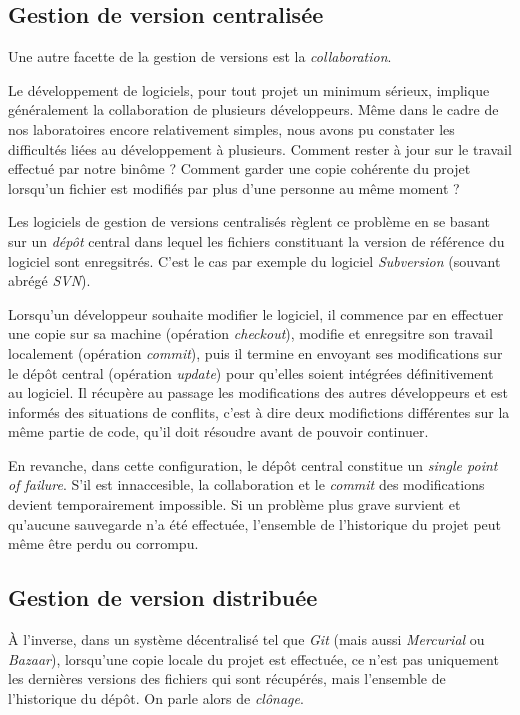 \documentclass[11pt,a4paper]{article}
\begin{document}
\subsection{Gestion de version centralisée}

Une autre facette de la gestion de versions est la \textit{collaboration}. 

Le développement de logiciels, pour tout projet un minimum sérieux, implique généralement la collaboration de plusieurs développeurs. Même dans le cadre de nos laboratoires encore relativement simples, nous avons pu constater les difficultés liées au développement à plusieurs. Comment rester à jour sur le travail effectué par notre binôme ? Comment garder une copie cohérente du projet lorsqu'un fichier est modifiés par plus d'une personne au même moment ?

Les logiciels de gestion de versions centralisés règlent ce problème en se basant sur un \textit{dépôt} central dans lequel les fichiers constituant la version de référence du logiciel sont enregsitrés. C'est le cas par exemple du logiciel \textit{Subversion} (souvant abrégé \textit{SVN}).

Lorsqu'un développeur souhaite modifier le logiciel, il commence par en effectuer une copie sur sa machine (opération \textit{checkout}), modifie et enregsitre son travail localement (opération \textit{commit}), puis il termine en envoyant ses modifications sur le dépôt central (opération \textit{update}) pour qu'elles soient intégrées définitivement au logiciel. Il récupère au passage les modifications des autres développeurs et est informés des situations de conflits, c'est à dire deux modifictions différentes sur la même partie de code, qu'il doit résoudre avant de pouvoir continuer.

En revanche, dans cette configuration, le dépôt central constitue un \textit{single point of failure}. S'il est innaccesible, la collaboration et le \textit{commit} des modifications devient temporairement impossible. Si un problème plus grave survient et qu'aucune sauvegarde n'a été effectuée, l'ensemble de l'historique du projet peut même être perdu ou corrompu.

\subsection{Gestion de version distribuée}

À l'inverse, dans un système décentralisé tel que \textit{Git} (mais aussi \textit{Mercurial} ou \textit{Bazaar}), lorsqu'une copie locale du projet est effectuée, ce n'est pas uniquement les dernières versions des fichiers qui sont récupérés, mais l'ensemble de l'historique du dépôt. On parle alors de \textit{clônage}.
\end{document}
